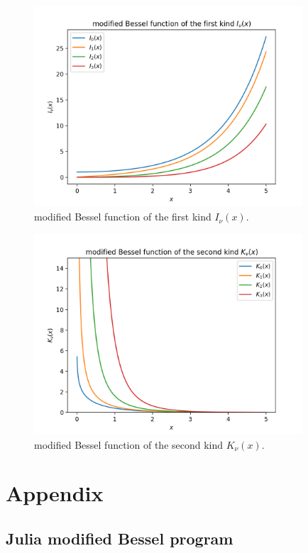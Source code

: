 \documentclass[11pt]{article}
\begin{document}
\begin{figure}[htp]
    \centering
    \includegraphics[width=10cm]{Figure_1.png}
    \caption{modified Bessel function of the first kind $I_{\nu}(x)$.}
    \label{fig:img}
\end{figure}


\begin{figure}[htp]
    \centering
    \includegraphics[width=10cm]{Figure_2.png}
    \caption{modified Bessel function of the second kind $K_{\nu}(x)$.}
    \label{fig:img}
\end{figure}


\clearpage

\section*{Appendix}



\subsection*{Julia modified Bessel program}


\clearpage


\end{document}
